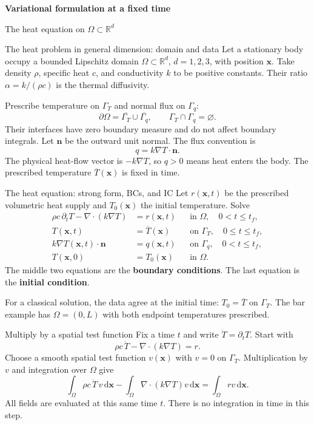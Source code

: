 \documentclass[11pt,aspectratio=169]{beamer}
\newcommand{\dd}{\mathrm d}
\newcommand{\bx}{\bm x}
\begin{document}
\begin{frame}
\centering\vfill
{\LARGE\bfseries Variational formulation at a fixed time\par}
\vspace{0.4cm}
The heat equation on $\Omega\subset\mathbb R^d$
\vfill
\end{frame}

\begin{frame}{The heat problem in general dimension: domain and data}
Let a stationary body occupy a bounded Lipschitz domain
$\Omega\subset\mathbb R^d$, $d=1,2,3$, with position $\bx$.
Take density $\rho$, specific heat $c$, and conductivity $k$ to be positive constants.
Their ratio $\alpha=k/(\rho c)$ is the thermal diffusivity.
\medskip

Prescribe temperature on $\Gamma_T$ and normal flux on $\Gamma_q$:
\[
\partial\Omega=\overline{\Gamma_T}\cup\overline{\Gamma_q},
\qquad \Gamma_T\cap\Gamma_q=\varnothing.
\]
Their interfaces have zero boundary measure and do not affect boundary integrals.
Let $\bm n$ be the outward unit normal. The flux convention is
\[
q=k\nabla T\cdot\bm n.
\]
The physical heat-flow vector is $-k\nabla T$, so $q>0$ means heat enters the body.
The prescribed temperature $\overline T(\bx)$ is fixed in time.
\end{frame}

\begin{frame}{The heat equation: strong form, BCs, and IC}
Let $r(\bx,t)$ be the prescribed volumetric heat supply and
$T_0(\bx)$ the initial temperature. Solve
\[
\boxed{\begin{aligned}
\rho c\,\partial_tT-\nabla\!\cdot(k\nabla T)&=r(\bx,t)
&&\text{in }\Omega,\quad 0<t\le t_f,\\
T(\bx,t)&=\overline T(\bx)
&&\text{on }\Gamma_T,\quad 0\le t\le t_f,\\
k\nabla T(\bx,t)\cdot\bm n&=q(\bx,t)
&&\text{on }\Gamma_q,\quad 0<t\le t_f,\\
T(\bx,0)&=T_0(\bx)
&&\text{in }\Omega.
\end{aligned}}
\]
The middle two equations are the \textbf{boundary conditions}.
The last equation is the \textbf{initial condition}.
\medskip

For a classical solution, the data agree at the initial time:
$T_0=\overline T$ on $\Gamma_T$.
The bar example has $\Omega=(0,L)$ with both endpoint temperatures prescribed.
\end{frame}

\begin{frame}{Multiply by a spatial test function}
Fix a time $t$ and write $\dot T=\partial_tT$. Start with
\[
\rho c\,\dot T-\nabla\!\cdot(k\nabla T)=r.
\]
Choose a smooth spatial test function $v(\bx)$ with $v=0$ on $\Gamma_T$.
Multiplication by $v$ and integration over $\Omega$ give
\[
\int_\Omega\rho c\,\dot T\,v\,\dd\bx
-\int_\Omega\nabla\!\cdot(k\nabla T)v\,\dd\bx
=\int_\Omega rv\,\dd\bx.
\]
All fields are evaluated at this same time $t$.
There is no integration in time in this step.
\end{frame}
\end{document}
